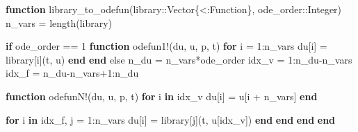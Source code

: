 \documentclass[
]{article}
\newenvironment{Shaded}{\begin{snugshade}}{\end{snugshade}}
\newcommand{\ControlFlowTok}[1]{\textcolor[rgb]{0.00,0.23,0.31}{\textbf{#1}}}
\newcommand{\DataTypeTok}[1]{\textcolor[rgb]{0.68,0.00,0.00}{#1}}
\newcommand{\FloatTok}[1]{\textcolor[rgb]{0.68,0.00,0.00}{#1}}
\newcommand{\FunctionTok}[1]{\textcolor[rgb]{0.28,0.35,0.67}{#1}}
\newcommand{\KeywordTok}[1]{\textcolor[rgb]{0.00,0.23,0.31}{\textbf{#1}}}
\newcommand{\NormalTok}[1]{\textcolor[rgb]{0.00,0.23,0.31}{#1}}
\newcommand{\OperatorTok}[1]{\textcolor[rgb]{0.37,0.37,0.37}{#1}}
\begin{document}
\begin{tcolorbox}[enhanced jigsaw, bottomrule=.15mm, toprule=.15mm, coltitle=black, colframe=quarto-callout-tip-color-frame, colbacktitle=quarto-callout-tip-color!10!white, bottomtitle=1mm, toptitle=1mm, opacitybacktitle=0.6, titlerule=0mm, title={Generate a function applying library functions to an integrand (Julia
implementation)}, left=2mm, leftrule=.75mm, rightrule=.15mm, breakable, colback=white, arc=.35mm, opacityback=0]

\begin{Shaded}
\begin{Highlighting}[]
\KeywordTok{function} \FunctionTok{library\_to\_odefun}\NormalTok{(library}\OperatorTok{::}\DataTypeTok{Vector\{\textless{}:Function\}}\NormalTok{, ode\_order}\OperatorTok{::}\DataTypeTok{Integer}\NormalTok{)}
\NormalTok{  n\_vars }\OperatorTok{=} \FunctionTok{length}\NormalTok{(library)}

  \ControlFlowTok{if}\NormalTok{ ode\_order }\OperatorTok{==} \FloatTok{1}
    \KeywordTok{function} \FunctionTok{odefun1!}\NormalTok{(du, u, p, t)}
      \ControlFlowTok{for}\NormalTok{ i }\OperatorTok{=} \FloatTok{1}\OperatorTok{:}\NormalTok{n\_vars}
\NormalTok{        du[i] }\OperatorTok{=}\NormalTok{ library[i](t, u)}
      \ControlFlowTok{end}
    \ControlFlowTok{end}
\NormalTok{  else}
\NormalTok{    n\_du }\OperatorTok{=}\NormalTok{ n\_vars}\OperatorTok{*}\NormalTok{ode\_order}
\NormalTok{    idx\_v }\OperatorTok{=} \FloatTok{1}\OperatorTok{:}\NormalTok{n\_du}\OperatorTok{{-}}\NormalTok{n\_vars}
\NormalTok{    idx\_f }\OperatorTok{=}\NormalTok{ n\_du}\OperatorTok{{-}}\NormalTok{n\_vars}\OperatorTok{+}\FloatTok{1}\OperatorTok{:}\NormalTok{n\_du}

    \KeywordTok{function} \FunctionTok{odefunN!}\NormalTok{(du, u, p, t)}
      \ControlFlowTok{for}\NormalTok{ i }\KeywordTok{in}\NormalTok{ idx\_v}
\NormalTok{        du[i] }\OperatorTok{=}\NormalTok{ u[i }\OperatorTok{+}\NormalTok{ n\_vars]}
      \ControlFlowTok{end}

      \ControlFlowTok{for}\NormalTok{ i }\KeywordTok{in}\NormalTok{ idx\_f, j }\OperatorTok{=} \FloatTok{1}\OperatorTok{:}\NormalTok{n\_vars}
\NormalTok{        du[i] }\OperatorTok{=}\NormalTok{ library[j](t, u[idx\_v])}
      \ControlFlowTok{end}
    \KeywordTok{end}
  \KeywordTok{end}
\KeywordTok{end}
\end{Highlighting}
\end{Shaded}

\end{tcolorbox}
\end{document}
